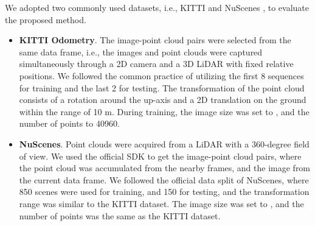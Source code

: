 \documentclass[lettersize,journal]{IEEEtran}
\begin{document}
We adopted two commonly used datasets, i.e., KITTI \cite{KITTI} and NuScenes \cite{NUSCENES}, to evaluate the proposed method.
\begin{itemize}
\item{\textbf{KITTI Odometry}\cite{KITTI}}.
The image-point cloud pairs were selected from the same data frame, i.e., the images and point clouds were captured simultaneously through a 2D camera and a 3D LiDAR with fixed relative positions. We followed the common practice \cite{DEEPI2P} of utilizing the first 8 sequences for training and the last 2 for testing. The transformation of the point cloud consists of a rotation around the up-axis and a 2D translation on the ground within the range of 10 m. During training, the image size was set to , and the number of points to 40960.

\item{\textbf{NuScenes}\cite{NUSCENES}}.
Point clouds were acquired from a LiDAR with a 360-degree field of view. We used the official SDK to get the image-point cloud pairs, where the point cloud was accumulated from the nearby frames, and the image from the current data frame. We followed the official data split of NuScenes, where 850 scenes were used for training, and 150 for testing, and the transformation range was similar to the KITTI dataset. The image size was set to , and the number of points was the same as the KITTI dataset.
\end{itemize}

\begin{table*}[h]
\centering
\renewcommand\arraystretch{1.5}
\end{table*}
\end{document}
